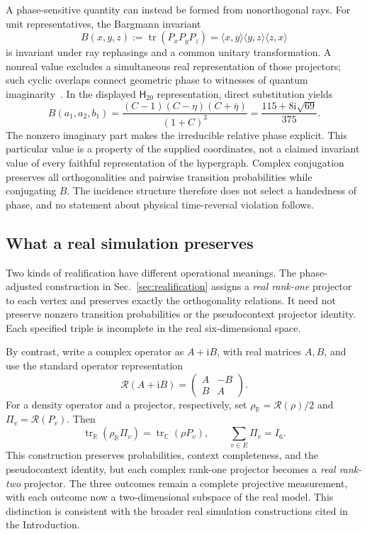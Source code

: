 \documentclass[twocolumn,aps,pra,floatfix,amsmath,amssymb,longbibliography]{revtex4-2}
\theoremstyle{definition}
\theoremstyle{remark}
\newcommand{\ii}{\mathrm{i}}
\newcommand{\C}{\mathbb C}
\newcommand{\R}{\mathbb R}
\newcommand{\Htwenty}{\mathsf H_{20}}
\begin{document}
A phase-sensitive quantity can instead be formed from nonorthogonal rays.
For unit representatives, the Bargmann invariant
\[
 B(x,y,z):=\operatorname{tr}(P_xP_yP_z)
 =\langle x,y\rangle\langle y,z\rangle\langle z,x\rangle
\]
is invariant under ray rephasings and a common unitary transformation.
A nonreal value excludes a simultaneous real representation of those
projectors; such cyclic overlaps connect geometric phase to witnesses of
quantum imaginarity~\cite{MukundaEtAl2003Bargmann,
LiTan2025BargmannImaginarity}.  In the displayed $\Htwenty$ representation,
direct substitution yields
\[
 B(a_1,a_2,b_1)
 =\frac{(C-1)(C-\eta)(C+\bar\eta)}{(1+C)^3}
 =\frac{115+8\ii\sqrt{69}}{375}.
\]
The nonzero imaginary part makes the irreducible relative phase explicit.
This particular value is a property of the supplied coordinates, not a
claimed invariant value of every faithful representation of the hypergraph.
Complex conjugation preserves all orthogonalities and pairwise transition
probabilities while conjugating $B$.  The incidence structure therefore
does not select a handedness of phase, and no statement about physical
time-reversal violation follows.

\subsection{What a real simulation preserves}

Two kinds of realification have different operational meanings.  The
phase-adjusted construction in Sec.~\ref{sec:realification} assigns a
\emph{real rank-one} projector to each vertex and preserves exactly the
orthogonality relations.  It need not preserve nonzero transition
probabilities or the pseudocontext projector identity.  Each specified
triple is incomplete in the real six-dimensional space.

By contrast, write a complex operator as $A+\ii B$, with real matrices
$A,B$, and use the standard operator representation
\[
 \mathcal R(A+\ii B)=
 \begin{pmatrix}A&-B\\ B&A\end{pmatrix}.
\]
For a density operator and a projector, respectively, set
$\rho_{\R}=\mathcal R(\rho)/2$ and
$\Pi_v=\mathcal R(P_v)$.  Then
\[
 \operatorname{tr}_{\R}(\rho_{\R}\Pi_v)
 =\operatorname{tr}_{\C}(\rho P_v),\qquad
 \sum_{v\in E}\Pi_v=I_6.
\]
This construction preserves probabilities, context completeness, and the
pseudocontext identity, but each complex rank-one projector becomes a
\emph{real rank-two} projector.  The three outcomes remain a complete
projective measurement, with each outcome now a two-dimensional subspace
of the real model.  This distinction is consistent with the broader real
simulation constructions cited in the Introduction.
\end{document}
